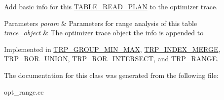 Add basic info for this \mbox{\hyperlink{classTABLE__READ__PLAN}{T\+A\+B\+L\+E\+\_\+\+R\+E\+A\+D\+\_\+\+P\+L\+AN}} to the optimizer trace.


\begin{DoxyParams}{Parameters}
{\em param} & Parameters for range analysis of this table \\
\hline
{\em trace\+\_\+object} & The optimizer trace object the info is appended to \\
\hline
\end{DoxyParams}


Implemented in \mbox{\hyperlink{classTRP__GROUP__MIN__MAX_aeff4d1a82cdb7f15f61d34191971967f}{T\+R\+P\+\_\+\+G\+R\+O\+U\+P\+\_\+\+M\+I\+N\+\_\+\+M\+AX}}, \mbox{\hyperlink{classTRP__INDEX__MERGE_a2d384b4469b8be6dc5c246f7d5ad4307}{T\+R\+P\+\_\+\+I\+N\+D\+E\+X\+\_\+\+M\+E\+R\+GE}}, \mbox{\hyperlink{classTRP__ROR__UNION_abbb6e6faf397eac6302db5d9c07c2ac9}{T\+R\+P\+\_\+\+R\+O\+R\+\_\+\+U\+N\+I\+ON}}, \mbox{\hyperlink{classTRP__ROR__INTERSECT_a298712f5cb20fc34554cfe1cc6570bec}{T\+R\+P\+\_\+\+R\+O\+R\+\_\+\+I\+N\+T\+E\+R\+S\+E\+CT}}, and \mbox{\hyperlink{classTRP__RANGE_a825eead18ac6efe593cc6bf85006d6d7}{T\+R\+P\+\_\+\+R\+A\+N\+GE}}.



The documentation for this class was generated from the following file\+:\begin{DoxyCompactItemize}
\item 
opt\+\_\+range.\+cc\end{DoxyCompactItemize}
